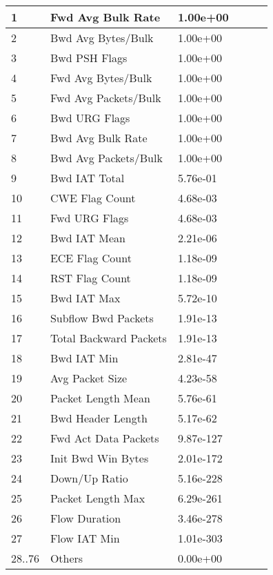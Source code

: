 \begin{center}
\begin{longtable}{|l|l|l|l|l|l|}
        1 & Fwd Avg Bulk Rate & 1.00e+00 \\
        \hline
        2 & Bwd Avg Bytes/Bulk & 1.00e+00 \\
        \hline
        3 & Bwd PSH Flags & 1.00e+00 \\
        \hline
        4 & Fwd Avg Bytes/Bulk & 1.00e+00 \\
        \hline
        5 & Fwd Avg Packets/Bulk & 1.00e+00 \\
        \hline
        6 & Bwd URG Flags & 1.00e+00 \\
        \hline
        7 & Bwd Avg Bulk Rate & 1.00e+00 \\
        \hline
        8 & Bwd Avg Packets/Bulk & 1.00e+00 \\
        \hline
        9 & Bwd IAT Total & 5.76e-01 \\
        \hline
        10 & CWE Flag Count & 4.68e-03 \\
        \hline
        11 & Fwd URG Flags & 4.68e-03 \\
        \hline
        12 & Bwd IAT Mean & 2.21e-06 \\
        \hline
        13 & ECE Flag Count & 1.18e-09 \\
        \hline
        14 & RST Flag Count & 1.18e-09 \\
        \hline
        15 & Bwd IAT Max & 5.72e-10 \\
        \hline
        16 & Subflow Bwd Packets & 1.91e-13 \\
        \hline
        17 & Total Backward Packets & 1.91e-13 \\
        \hline
        18 & Bwd IAT Min & 2.81e-47 \\
        \hline
        19 & Avg Packet Size & 4.23e-58 \\
        \hline
        20 & Packet Length Mean & 5.76e-61 \\
        \hline
        21 & Bwd Header Length & 5.17e-62 \\
        \hline
        22 & Fwd Act Data Packets & 9.87e-127 \\
        \hline
        23 & Init Bwd Win Bytes & 2.01e-172 \\
        \hline
        24 & Down/Up Ratio & 5.16e-228 \\
        \hline
        25 & Packet Length Max & 6.29e-261 \\
        \hline
        26 & Flow Duration & 3.46e-278 \\
        \hline
        27 & Flow IAT Min & 1.01e-303 \\
        \hline
        28..76 & Others & 0.00e+00 \\
        \hline
    \end{longtable}
\end{center}

